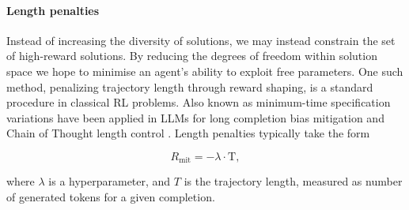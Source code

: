 \paragraph{Length penalties}

Instead of increasing the diversity of solutions, we may instead constrain the set of high-reward solutions. By reducing the degrees of freedom within solution space we hope to minimise an agent's ability to exploit free parameters. One such method, penalizing trajectory length through reward shaping, is a standard procedure in classical RL problems. Also known as minimum-time specification \cite{vasan2024revisiting} variations have been applied in LLMs for long completion bias mitigation \cite{chen2024bootstrapping} and Chain of Thought length control \cite{su2025thinking}. Length penalties typically take the form

\begin{equation} 
    R_{\mathrm{mit}} =  - \lambda\cdot\mathrm{T},
\end{equation}

where $\lambda$ is a hyperparameter, and $T$ is the trajectory length, measured as number of generated tokens for a given completion. 